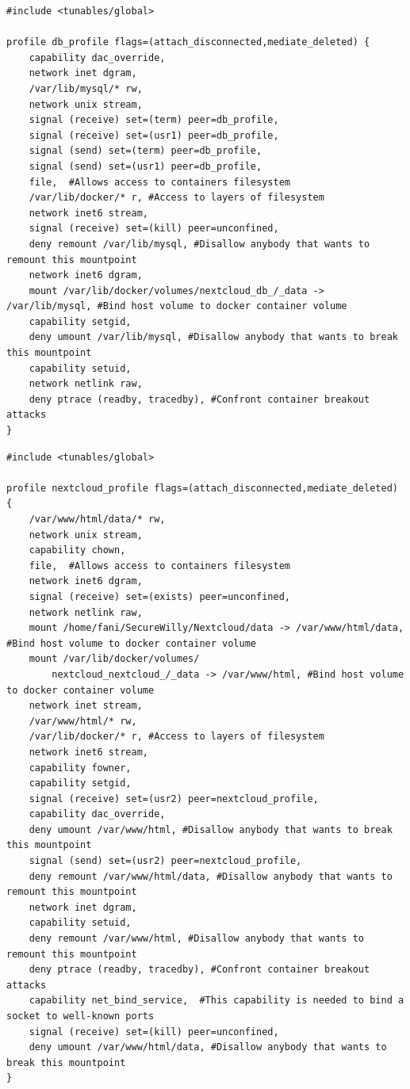 \begin{lstlisting}[style=Dockerfile, caption={New AppArmor profile for db service: db\_profile}]
#include <tunables/global>

profile db_profile flags=(attach_disconnected,mediate_deleted) {
	capability dac_override,
	network inet dgram,
	/var/lib/mysql/* rw,
	network unix stream,
	signal (receive) set=(term) peer=db_profile,
	signal (receive) set=(usr1) peer=db_profile,
	signal (send) set=(term) peer=db_profile,
	signal (send) set=(usr1) peer=db_profile,
	file,  #Allows access to containers filesystem
	/var/lib/docker/* r, #Access to layers of filesystem
	network inet6 stream,
	signal (receive) set=(kill) peer=unconfined,
	deny remount /var/lib/mysql, #Disallow anybody that wants to remount this mountpoint
	network inet6 dgram,
	mount /var/lib/docker/volumes/nextcloud_db_/_data -> /var/lib/mysql, #Bind host volume to docker container volume
	capability setgid,
	deny umount /var/lib/mysql, #Disallow anybody that wants to break this mountpoint
	capability setuid,
	network netlink raw,
	deny ptrace (readby, tracedby), #Confront container breakout attacks
}
\end{lstlisting}

\begin{lstlisting}[style=Dockerfile, caption={New AppArmor profile for nextcloud service: nextcloud\_profile}]
#include <tunables/global>

profile nextcloud_profile flags=(attach_disconnected,mediate_deleted) {
	/var/www/html/data/* rw,
	network unix stream,
	capability chown,
	file,  #Allows access to containers filesystem
	network inet6 dgram,
	signal (receive) set=(exists) peer=unconfined,
	network netlink raw,
	mount /home/fani/SecureWilly/Nextcloud/data -> /var/www/html/data, #Bind host volume to docker container volume
	mount /var/lib/docker/volumes/
		nextcloud_nextcloud_/_data -> /var/www/html, #Bind host volume to docker container volume
	network inet stream,
	/var/www/html/* rw,
	/var/lib/docker/* r, #Access to layers of filesystem
	network inet6 stream,
	capability fowner,
	capability setgid,
	signal (receive) set=(usr2) peer=nextcloud_profile,
	capability dac_override,
	deny umount /var/www/html, #Disallow anybody that wants to break this mountpoint
	signal (send) set=(usr2) peer=nextcloud_profile,
	deny remount /var/www/html/data, #Disallow anybody that wants to remount this mountpoint
	network inet dgram,
	capability setuid,
	deny remount /var/www/html, #Disallow anybody that wants to remount this mountpoint
	deny ptrace (readby, tracedby), #Confront container breakout attacks
	capability net_bind_service,  #This capability is needed to bind a socket to well-known ports
	signal (receive) set=(kill) peer=unconfined,
	deny umount /var/www/html/data, #Disallow anybody that wants to break this mountpoint
}
\end{lstlisting}

